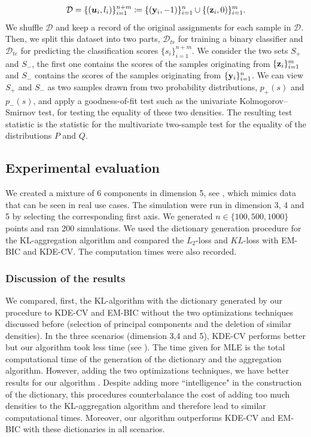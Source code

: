\begin{equation}
  \mathcal{D} = \{(\boldsymbol u_i,l_i)\}_{i=1}^{n+m}  \coloneqq  \{(\mathbf y_i,-1)\}_{i=1}^n \cup \{(\mathbf z_i,0)\}_{i=1}^m.
\end{equation}
We shuffle $\mathcal{D}$ and keep a record of the original assignments for each sample in $\mathcal{D}$. Then, we split this dataset into two parts, $\mathcal{D}_{tr}$ for training a binary classifier and $\mathcal{D}_{te}$ for predicting the classification scores $\{s_i\}_{i=1}^{n+m}$. We consider the two sets $S_+$ and $S_-$, the first one contains the scores of the samples originating from $\{\mathbf z_i\}_{i=1}^m$ and $S_-$ contains the scores of the samples originating from $\{\mathbf y_i\}_{i=1}^n$. We can view $S_+$ and $S_-$ as two samples drawn from two probability distributions, $p_+(s)$ and $p_-(s)$, and  apply a goodness-of-fit test such as the univariate Kolmogorov–Smirnov test, for testing the equality of these two densities. The resulting test statistic is the statistic for the multivariate two-sample test for the equality of the distributions $P$ and $Q$.

\subsection{Experimental evaluation}

We created a mixture of 6 components in dimension 5, see , which mimics data that can be seen in real use cases. The simulation were run in dimension 3, 4 and 5 by selecting the corresponding first axis. We generated $n\in\{100, 500, 1000\}$ points and ran 200 simulations. We used the dictionary generation procedure for the KL-aggregation algorithm and compared the $L_2$-loss and $KL$-loss with EM-BIC and KDE-CV. The computation times were also recorded.

\subsubsection{Discussion of the results}
We compared, first, the KL-algorithm with the dictionary generated by our procedure to KDE-CV and EM-BIC without the two optimizations techniques discussed before (selection of principal components and the deletion of similar densities). In the three scenarios (dimension 3,4 and 5), KDE-CV performs better but our algorithm took less time (see ). The time given for MLE is the total computational time of the generation of the dictionary and the aggregation algorithm. However, adding the two optimizations techniques, we have better results for our algorithm . Despite adding more  ``intelligence" in the construction of the dictionary, this procedures counterbalance the cost of adding too much densities to the KL-aggregation algorithm and therefore lead to similar computational times. Moreover, our algorithm outperforms KDE-CV and EM-BIC with these dictionaries in all scenarios.

